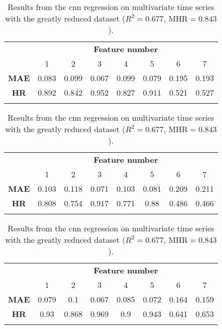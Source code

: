 \begin{table}
    \begin{center}
        \caption{\label{tab:mts_lin:comp} Results from the \ac{cnn} regression on multivariate time series with the complete dataset (\(R^2 = 0.595\), \(\text{MHR} = 0.782\)).}
        \begin{tabular}{ >{\bfseries}c c c c c c c c }
            \multirow{2}{*}{\textbf{Measure}} & \multicolumn{7}{c}{\textbf{Feature number}} \\
            & 1 & 2 & 3 & 4 & 5 & 6 & 7 \\
            \midrule
            MAE & 0.083 & 0.099 & 0.067 & 0.099 & 0.079 & 0.195 & 0.193 \\
            HR  & 0.892 & 0.842 & 0.952 & 0.827 & 0.911 & 0.521 & 0.527 \\
            \\
        \end{tabular}

        \caption{\label{tab:mts_lin:red} Results from the \ac{cnn} regression on multivariate time series with the reduced dataset (\(R^2 = 0.463\), \(\text{MHR} = 0.726\)).}
        \begin{tabular}{ >{\bfseries}c c c c c c c c }
            \multirow{2}{*}{\textbf{Measure}} & \multicolumn{7}{c}{\textbf{Feature number}} \\
            & 1 & 2 & 3 & 4 & 5 & 6 & 7 \\
            \midrule
            MAE & 0.103 & 0.118 & 0.071 & 0.103 & 0.081 & 0.209 & 0.211 \\
            HR  & 0.808 & 0.754 & 0.917 & 0.771 & 0.88 & 0.486 & 0.466 \\
            \\
        \end{tabular}

        \caption{\label{tab:mts_lin:vred} Results from the \ac{cnn} regression on multivariate time series with the greatly reduced dataset (\(R^2 = 0.677\), \(\text{MHR} = 0.843\)).}
        \begin{tabular}{ >{\bfseries}c c c c c c c c }
            \multirow{2}{*}{\textbf{Measure}} & \multicolumn{7}{c}{\textbf{Feature number}} \\
            & 1 & 2 & 3 & 4 & 5 & 6 & 7 \\
            \midrule
            MAE & 0.079 & 0.1 & 0.067 & 0.085 & 0.072 & 0.164 & 0.159 \\
            HR  & 0.93 & 0.868 & 0.969 & 0.9 & 0.943 & 0.641 & 0.653 \\
            \\
        \end{tabular}
    \end{center}
\end{table}

